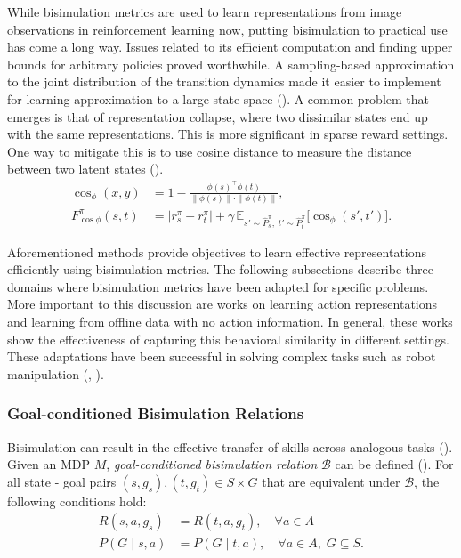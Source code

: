 \documentclass{article}
\begin{document}
While bisimulation metrics are used to learn representations from image observations in reinforcement learning now, putting bisimulation to practical use has come a long way. Issues related to its efficient computation and finding upper bounds for arbitrary policies proved worthwhile. A sampling-based approximation to the joint distribution of the transition dynamics made it easier to implement for learning approximation to a large-state space (\cite{castro2021mico}). A common problem that emerges is that of representation collapse, where two dissimilar states end up with the same representations. This is more significant in sparse reward settings. One way to mitigate this is to use cosine distance to measure the distance between two latent states (\cite{zang2022simsr}). 
\begin{align}
\cos_{\phi}(x, y) 
&= 1 - \frac{\phi(s)^\top \phi(t)}
        {\|\phi(s)\| \cdot \|\phi(t)\|},
\label{eq:cosine} \\[1ex]
F^{\pi}_{\cos\phi}(s, t) 
&= \big| r^{\pi}_s - r^{\pi}_t \big|
   + \gamma \, \mathbb{E}_{s' \sim \hat{P}^{\pi}_s, \; t' \sim \hat{P}^{\pi}_t}
      \big[ \cos_{\phi}(s', t') \big].
\label{eq:simsr}
\end{align}

Aforementioned methods provide objectives to learn effective representations efficiently using bisimulation metrics. The following subsections describe three domains where bisimulation metrics have been adapted for specific problems. More important to this discussion are works on learning action representations and learning from offline data with no action information. In general, these works show the effectiveness of capturing this behavioral similarity in different settings. These adaptations have been successful in solving complex tasks such as robot manipulation (\cite{hansen2022bisimulation}, \cite{shi2024self}). 

\subsubsection{Goal-conditioned Bisimulation Relations}
Bisimulation can result in the effective transfer of skills across analogous tasks (\cite{hansen2022bisimulation}). Given an MDP $M$, \emph{goal-conditioned bisimulation relation}  $\mathcal{B}$ can be defined (\cite{hansen2022bisimulation}). For all state - goal pairs $(s, g_s), (t, g_t) \in S \times G$ that are equivalent under 
$\mathcal{B}$, the following conditions hold:
\begin{align}
    R(s, a, g_s) &= R(t, a, g_t), \quad \forall a \in A \label{eq:reward-cond} \\
    P(G \mid s, a) &= P(G \mid t, a), \quad \forall a \in A, \; G \subseteq S. \label{eq:transition-cond}
\end{align}
\end{document}
